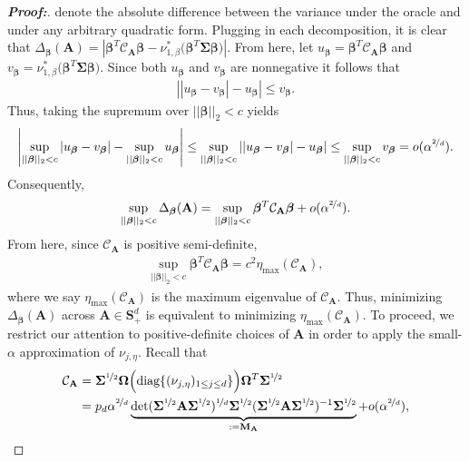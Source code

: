 \documentclass[11pt,twoside]{article}
\theoremstyle{definition}
\theoremstyle{remark}
\begin{document}
\begin{proof}[\textbf{Proof:}]
denote the absolute difference between the variance under the oracle and under any arbitrary quadratic form. Plugging in each decomposition, it is clear that $\Delta_{\bm{\beta}}(\mathbf{A})  = |\bm{\beta}^T \mathcal{C}_{\mathbf{A}} \bm{\beta} - \nu^*_{1,\beta} \big( \bm{\beta}^T \mathbf{\Sigma} \bm{\beta}\big)|$. From here, let $u_{\bm{\beta}} = \bm{\beta}^T \mathcal{C}_{\mathbf{A}} \bm{\beta}$ and $v_{\bm{\beta}} = \nu^*_{1,\beta} \big( \bm{\beta}^T \mathbf{\Sigma} \bm{\beta}\big)$. Since both $u_{\bm{\beta}}$ and $v_{\bm{\beta}}$ are nonnegative it follows that
\begin{align*}
    \left| |u_{\bm{\beta}}-v_{\bm{\beta}}| - u_{\bm{\beta}} \right| \leq v_{\bm{\beta}}.
\end{align*}
Thus, taking the supremum over $||\bm{\beta} ||_2<c$ yields
\begin{align*}
\left| \sup_{||\bm{\beta}||_2<c} |u_{\bm{\beta}}-v_{\bm{\beta}}| - \sup_{||\bm{\beta}||_2<c} u_{\bm{\beta}}
\right|  \leq \sup_{||\bm{\beta}||_2<c} \left| |u_{\bm{\beta}}-v_{\bm{\beta}}| - u_{\bm{\beta}} \right| \leq \sup_{||\bm{\beta}||_2<c} v_{\bm{\beta}} = o(\alpha^{\nicefrac{2}{d}}).
\end{align*}
Consequently,
\begin{align*}
\sup_{||\bm{\beta}||_2<c} \Delta_{\bm{\beta}}(\mathbf{A})   = \sup_{||\bm{\beta}||_2<c} \bm{\beta}^T\mathcal{C}_{\mathbf{A}}\bm{\beta} + o(\alpha^{\nicefrac{2}{d}}).
\end{align*}
From here, since $\mathcal{C}_{\mathbf{A}}$ is positive semi-definite,
\begin{align*}
    \sup_{||\bm{\beta}||_2<c} \bm{\beta}^T\mathcal{C}_{\mathbf{A}}\bm{\beta} = c^2\eta_{\max}(\mathcal{C}_{\mathbf{A}}),
\end{align*}
where we say $\eta_{\max}(\mathcal{C}_{\mathbf{A}})$ is the maximum eigenvalue of $\mathcal{C}_{\mathbf{A}}$. Thus, minimizing $\Delta_{\bm{\beta}}(\mathbf{A})$ across $\mathbf{A} \in \mathbf{S}^d_{+}$ is equivalent to minimizing $\eta_{\max}(\mathcal{C}_{\mathbf{A}})$. To proceed, we restrict our attention to positive-definite choices of $\mathbf{A}$ in order to apply the small-$\alpha$ approximation of $\nu_{j, \eta}$. Recall that
\begin{align*}
    \mathcal{C}_{\mathbf{A}} &= \mathbf{\Sigma}^{\nicefrac{1}{2}} \mathbf{\Omega} \Big(\text{diag}\{(\nu_{j, \eta})_{1 \leq j \leq d} \} \Big) \mathbf{\Omega}^T \mathbf{\Sigma}^{\nicefrac{1}{2}} \\
    &= p_d\alpha^{\nicefrac{2}{d}} \underbrace{\text{det}(\mathbf{\Sigma}^{\nicefrac{1}{2}} \mathbf{A} \mathbf{\Sigma}^{\nicefrac{1}{2}})^{\nicefrac{1}{d}} \mathbf{\Sigma}^{\nicefrac{1}{2}} (\mathbf{\Sigma}^{\nicefrac{1}{2}} \mathbf{A} \mathbf{\Sigma}^{\nicefrac{1}{2}})^{-1} \mathbf{\Sigma}^{\nicefrac{1}{2}}}_{:=\mathbf{M}_\mathbf{A}} + o(\alpha^{\nicefrac{2}{d}}),

\end{align*}
\end{proof}
\end{document}
